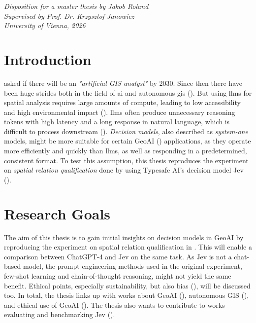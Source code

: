 




\maketitle
\textit{Disposition for a master thesis by Jakob Roland}\\
\textit{Supervised by Prof. Dr. Krzysztof Janowicz}\\
\textit{University of Vienna, 2026}

\section*{Introduction}
\cite{janowiczGeoAISpatiallyExplicit2020} asked if there will be an \textit{"artificial GIS analyst"} by 2030. Since then there have been huge strides both in the field of \gls{ai} and autonomous \gls{gis} (\cite{liGIScienceEraArtificial2025}). But using \gls{llms} for spatial analysis requires large amounts of compute, leading to low accessibility and high environmental impact (\cite{janowiczPhilosophicalFoundationsGeoAI2023, shiGeographyAISustainability2025}). \gls{llms} often produce unnecessary reasoning tokens with high latency and a long response in natural language, which is difficult to process downstream (\cite{wangTruncatedReasoningBudget2026,chenNOTThinkThat2025,duanGeneralDecisionModels2026}). \textit{Decision models}, also described as \textit{system-one} models, might be more suitable for certain GeoAI (\cite{janowiczGeoAISpatiallyExplicit2020}) applications, as they operate more efficiently and quickly than \acrshort{llms}, as well as responding in a predetermined, consistent format. To test this assumption, this thesis reproduces the experiment on \textit{spatial relation qualification} done by \cite{jiFoundationModelsGeospatial2025} using Typesafe AI's decision model Jev (\cite{IntroducingSystemOne}).

\section*{Research Goals}
The aim of this thesis is to gain initial insights on decision models in GeoAI by reproducing the experiment on spatial relation qualification in \cite{jiFoundationModelsGeospatial2025}. This will enable a comparison between ChatGPT-4 and Jev on the same task. As Jev is not a chat-based model, the prompt engineering methods used in the original experiment, few-shot learning and chain-of-thought reasoning, might not yield the same benefit. Ethical points, especially sustainability, but also bias (\cite{aldahoulJevDecisionModel2026}), will be discussed too. In total, the thesis links up with works about GeoAI (\cite{jiFoundationModelsGeospatial2025,janowiczGeoAISpatiallyExplicit2020}), autonomous GIS (\cite{liGIScienceEraArtificial2025}), and ethical use of GeoAI (\cite{shiGeographyAISustainability2025, janowiczPhilosophicalFoundationsGeoAI2023}). The thesis also wants to contribute to works evaluating and benchmarking Jev (\cite{wangTruncatedReasoningBudget2026, duanGeneralDecisionModels2026,deusserEvaluatingBenchmarkingSystem2026}).
\newpage

